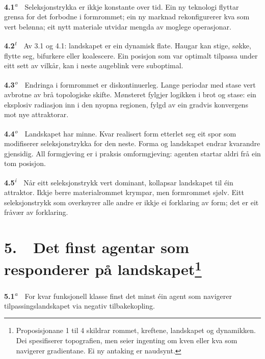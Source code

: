 \documentclass[10pt]{article}
\begin{document}
\noindent\textbf{4.1}\textsuperscript{\textit{a}}~~Seleksjonstrykka er ikkje konstante over tid. Ein ny teknologi flyttar grensa for det forbodne i formrommet; ein ny marknad rekonfigurerer kva som vert belønna; eit nytt materiale utvidar mengda av moglege operasjonar.




\noindent\textbf{4.2}\textsuperscript{\textit{t}}~~Av 3.1 og 4.1: landskapet er ein dynamisk flate. Haugar kan stige, søkke, flytte seg, bifurkere eller koalescere. Ein posisjon som var optimalt tilpassa under eitt sett av vilkår, kan i neste augeblink vere suboptimal.




\noindent\textbf{4.3}\textsuperscript{\textit{o}}~~Endringa i formrommet er diskontinuerleg. Lange periodar med stase vert avbrotne av brå topologiske skifte. Mønsteret fylgjer logikken i brot og stase: ein eksplosiv radiasjon inn i den nyopna regionen, fylgd av ein gradvis konvergens mot nye attraktorar.




\noindent\textbf{4.4}\textsuperscript{\textit{o}}~~Landskapet har minne. Kvar realisert form etterlet seg eit spor som modifiserer seleksjonstrykka for den neste. Forma og landskapet endrar kvarandre gjensidig. All formgjeving er i praksis omformgjeving: agenten startar aldri frå ein tom posisjon.




\noindent\textbf{4.5}\textsuperscript{\textit{i}}~~Når eitt seleksjonstrykk vert dominant, kollapsar landskapet til éin attraktor. Ikkje berre materialrommet krympar, men formrommet sjølv. Eitt seleksjonstrykk som overkøyrer alle andre er ikkje ei forklaring av form; det er eit fråvær av forklaring.







\chapter*{5.~~Det finst agentar som responderer på landskapet\footnote{Proposisjonane 1 til 4 skildrar rommet, kreftene, landskapet og dynamikken. Dei spesifiserer topografien, men seier ingenting om kven eller kva som navigerer gradientane. Ei ny antaking er naudsynt.}}




\noindent\textbf{5.1}\textsuperscript{\textit{a}}~~For kvar funksjonell klasse finst det minst éin agent som navigerer tilpassingslandskapet via negativ tilbakekopling.
\end{document}
